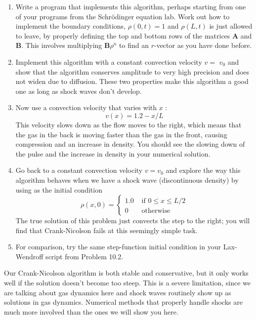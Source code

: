 \begin{problem}\label{P10.3}

\begin{enumerate}[label=(\alph*)]
\item  Write a program that implements this algorithm, perhaps starting from one of your programs from the Schr{\"o}dinger equation lab. Work out how to implement the boundary conditions, $\rho(0, t)=1$ and $\rho(L, t)$ is just allowed to leave, by properly defining the top and bottom rows of the matrices $\mathbf{A}$ and $\mathbf{B}$. This involves multiplying $\mathbf{B} \rho^{n}$ to find an $r$-vector as you have done before.
\item  Implement this algorithm with a constant convection velocity $v=$ $v_{0}$ and show that the algorithm conserves amplitude to very high precision and does not widen due to diffusion. These two properties make this algorithm a good one as long as shock waves don\rq t develop.
\item Now use a convection velocity that varies with $x$ :
\begin{equation}\label{eq:1019}
v(x)=1.2-x / L
\end{equation}
This velocity slows down as the flow moves to the right, which means
that the gas in the back is moving faster than the gas in the front,
causing compression and an increase in density. You should see the
slowing down of the pulse and the increase in density in your numerical solution.
\item Go back to a constant convection velocity $v = v_0$ and explore the way
this algorithm behaves when we have a shock wave (discontinuous
density) by using as the initial condition
\begin{equation}\label{eq:1020}
\rho(x, 0)= \begin{cases}1.0 & \text { if } 0 \leq x \leq L / 2 \\ 0 & \text { otherwise }\end{cases}
\end{equation}
The true solution of this problem just convects the step to the right;
you will find that Crank-Nicolson fails at this seemingly simple task.
\item For comparison, try the same step-function initial condition in your
Lax-Wendroff script from Problem 10.2.
\end{enumerate}
\end{problem}
Our Crank-Nicolson algorithm is both stable and conservative, but it only
works well if the solution doesn\rq t become too steep. This is a severe limitation,
since we are talking about gas dynamics here and shock waves routinely show up
as solutions in gas dynamics. Numerical methods that properly handle shocks
are much more involved than the ones we will show you here.
